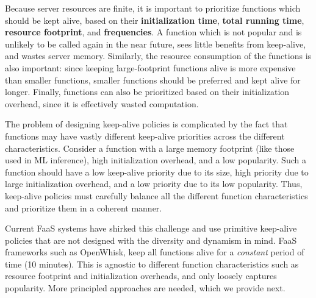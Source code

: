 Because server resources are finite, it is important to prioritize functions which should be kept alive, based on their \textbf{initialization time}, \textbf{total running time}, \textbf{resource footprint}, and \textbf{frequencies}.
A function which is not popular and is unlikely to be called again in the near future, sees little benefits from keep-alive, and wastes server memory. 
Similarly, the resource consumption of the functions is also important: since keeping large-footprint functions alive is more expensive than smaller functions, smaller functions should be preferred and kept alive for longer. 
Finally, functions can also be prioritized based on their initialization overhead, since it is effectively wasted computation.

The problem of designing keep-alive policies is complicated by the fact that functions may have vastly different keep-alive priorities across the different characteristics.
Consider a function with a large memory footprint (like those used in ML inference), high initialization overhead, and a low popularity.
Such a function should have a low keep-alive priority due to its size, high priority due to large initialization overhead, and a low priority due to its low popularity.
Thus, keep-alive policies must carefully balance all the different function characteristics and prioritize them in a coherent manner. 


Current FaaS systems have shirked this challenge and use primitive keep-alive policies that are not designed with the diversity and dynamism in mind. 
FaaS frameworks such as OpenWhisk, keep all functions alive for a \emph{constant} period of time (10 minutes). 
This is agnostic to different function characteristics such as resource footprint and initialization overheads, and only loosely captures popularity. 
More principled approaches are needed, which we provide next. 




